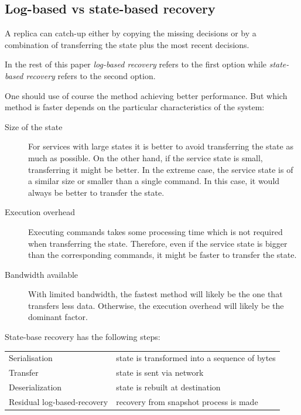 \subsection{Log-based vs state-based recovery}
\label{subsec:log_based_state_based_recovery}
A replica can catch-up either by copying the missing decisions or by a combination of transferring the state plus the most recent decisions.

In the rest of this paper \emph{log-based recovery} refers to the first option while \emph{state-based recovery} refers to the second option.

One should use of course the method achieving better performance. But which method is faster depends on the particular characteristics of the system:

\begin{description}
  \item[Size of the state] For services with large states  it is better to avoid transferring the state as much as possible. On the other hand, if the service state is small, transferring it might be better. In the extreme case, the service state is of a similar size or smaller than a single command. In this case, it would always be better to transfer the state.

  \item[Execution overhead] Executing commands takes some processing time which is not required when transferring the state. Therefore, even if the service state is bigger than the corresponding commands, it might be faster to transfer the state.

  \item[Bandwidth available] With limited bandwidth, the fastest  method will likely be the one that transfers less data. Otherwise, the execution overhead will likely be the dominant factor.
\end{description}


State-base recovery has the following steps:

\vspace{-0.5em}
\begin{center}
  \footnotesize
  \begin{tabular}{ll}
    Serialisation               & state is transformed into a sequence of bytes \\
    Transfer                    & state is sent via network \\
    Deserialization             & state is rebuilt at destination \vspace{0.5em} \\
    Residual log-based-recovery & recovery from snapshot process is made \\
  \end{tabular}
\end{center}
\vspace{-0.5em}

